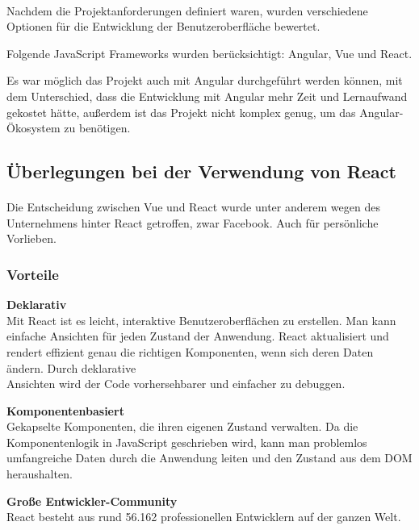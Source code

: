 \paragraph{}

Nachdem die Projektanforderungen definiert waren, wurden verschiedene Optionen für die Entwicklung der Benutzeroberfläche bewertet.

Folgende JavaScript Frameworks wurden berücksichtigt: Angular, Vue und React.

Es war möglich das Projekt auch mit Angular durchgeführt werden können, mit dem Unterschied, dass die Entwicklung mit Angular mehr Zeit und Lernaufwand gekostet hätte, außerdem ist das Projekt nicht komplex genug, um das Angular-Ökosystem zu benötigen.

\subsection{Überlegungen bei der Verwendung von React}
\paragraph{}
Die Entscheidung zwischen Vue und React wurde unter anderem wegen des Unternehmens hinter React getroffen, zwar Facebook. Auch für persönliche Vorlieben.
\newline
\subsubsection{Vorteile} 
\textbf{Deklarativ} \\
Mit React ist es leicht, interaktive Benutzeroberflächen zu erstellen. Man kann einfache Ansichten für jeden Zustand der Anwendung. React aktualisiert und rendert effizient genau die richtigen Komponenten, wenn sich deren Daten ändern.
Durch deklarative\\ Ansichten wird der Code vorhersehbarer und einfacher zu debuggen.
\newline

\textbf{Komponentenbasiert}\\
Gekapselte Komponenten, die ihren eigenen Zustand verwalten.
Da die Komponentenlogik in JavaScript geschrieben wird, kann man problemlos umfangreiche Daten durch die Anwendung leiten und den Zustand aus dem DOM heraushalten.
\newline

\textbf{Große Entwickler-Community}\\
React besteht aus rund 56.162 professionellen Entwicklern auf der ganzen Welt.

